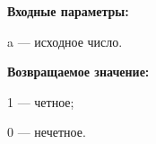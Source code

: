 \textbf{Входные параметры:}  
 
a --- исходное число.

\textbf{Возвращаемое значение:}

 1 --- четное;
 
 0 --- нечетное.